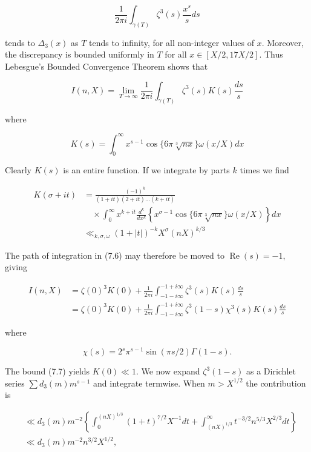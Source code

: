 \documentclass[10pt]{article}
\begin{document}
$$
\frac{1}{2 \pi i} \int_{\gamma(T)} \zeta^{3}(s) \frac{x^{s}}{s} d s
$$

tends to $\Delta_{3}(x)$ as $T$ tends to infinity, for all non-integer values of $x$. Moreover, the discrepancy is bounded uniformly in $T$ for all $x \in[X / 2,17 X / 2]$. Thus Lebesgue's Bounded Convergence Theorem shows that


\begin{equation*}
I(n, X)=\lim _{T \rightarrow \infty} \frac{1}{2 \pi i} \int_{\gamma(T)} \zeta^{3}(s) K(s) \frac{d s}{s} \tag{7.6}
\end{equation*}


where

$$
K(s)=\int_{0}^{\infty} x^{s-1} \cos \{6 \pi \sqrt[3]{n x}\} \omega(x / X) d x
$$

Clearly $K(s)$ is an entire function. If we integrate by parts $k$ times we find


\begin{align*}
K(\sigma+i t) & =\frac{(-1)^{k}}{(1+i t)(2+i t) \ldots(k+i t)}  \tag{7.7}\\
& \quad \times \int_{0}^{\infty} x^{k+i t} \frac{d^{k}}{d x^{k}}\left\{x^{\sigma-1} \cos \{6 \pi \sqrt[3]{n x}\} \omega(x / X)\right\} d x \\
& \ll_{k, \sigma, \omega}(1+|t|)^{-k} X^{\sigma}(n X)^{k / 3}
\end{align*}


The path of integration in (7.6) may therefore be moved to $\operatorname{Re}(s)=-1$, giving

$$
\begin{aligned}
I(n, X) & =\zeta(0)^{3} K(0)+\frac{1}{2 \pi i} \int_{-1-i \infty}^{-1+i \infty} \zeta^{3}(s) K(s) \frac{d s}{s} \\
& =\zeta(0)^{3} K(0)+\frac{1}{2 \pi i} \int_{-1-i \infty}^{-1+i \infty} \zeta^{3}(1-s) \chi^{3}(s) K(s) \frac{d s}{s}
\end{aligned}
$$

where

$$
\chi(s)=2^{s} \pi^{s-1} \sin (\pi s / 2) \Gamma(1-s) .
$$

The bound (7.7) yields $K(0) \ll 1$. We now expand $\zeta^{3}(1-s)$ as a Dirichlet series $\sum d_{3}(m) m^{s-1}$ and integrate termwise. When $m>X^{1 / 2}$ the contribution is

$$
\begin{aligned}
& \ll d_{3}(m) m^{-2}\left\{\int_{0}^{(n X)^{1 / 3}}(1+t)^{7 / 2} X^{-1} d t+\int_{(n X)^{1 / 3}}^{\infty} t^{-3 / 2} n^{5 / 3} X^{2 / 3} d t\right\} \\
& \ll d_{3}(m) m^{-2} n^{3 / 2} X^{1 / 2},
\end{aligned}
$$
\end{document}
